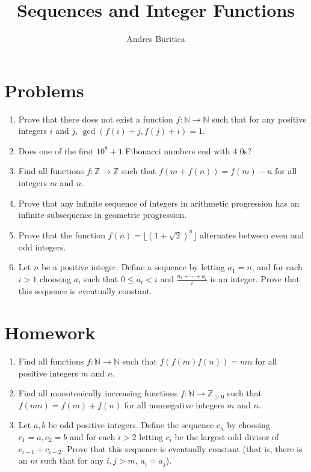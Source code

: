 \documentclass{article}
\title{Sequences and Integer Functions}
\author{Andres Buritica}
\date{}
\newcommand\Nn{\mathbb{N}}
\newcommand\Zz{\mathbb{Z}}
\begin{document}
\maketitle
\section{Problems}
\begin{enumerate}
  \item Prove that there does not exist a function $f:\Nn\to\Nn$
    such that for any positive integers $i$ and $j$,
    $\gcd(f(i)+j,f(j)+i)=1$.
  \item Does one of the first $10^8+1$ Fibonacci numbers end with 4 0s?
  \item Find all functions $f:\Zz\to\Zz$ such that $f(m+f(n))=f(m)-n$ for all
    integers $m$ and $n$.
  \item Prove that any infinite sequence of integers in arithmetic progression has an
    infinite subsequence in geometric progression.
  \item Prove that the function $f(n)=\lfloor(1+\sqrt 2)^n\rfloor$ alternates
    between even and odd integers.
  \item Let $n$ be a positive integer. Define a sequence by letting $a_1=n$, and
    for each $i>1$ choosing $a_i$ such that $0\le a_i<i$ and
    $\frac{a_1+\cdots+a_i}i$ is an integer. Prove that this sequence is
    eventually constant.
\end{enumerate}
\newpage
\section{Homework}
\begin{enumerate}
  \item Find all functions $f:\Nn\to\Nn$ such that $f(f(m)f(n))=mn$ for all
    positive integers $m$ and $n$.
  \item Find all monotonically increasing functions $f:\Nn\to\Zz_{\ge 0}$ such that $f(mn)=f(m)+f(n)$ for
    all nonnegative integers $m$ and $n$.
  \item Let $a,b$ be odd positive integers. Define the sequence $c_n$ by
    choosing $c_1=a,c_2=b$ and for each $i>2$ letting $c_i$ be the largest odd
    divisor of $c_{i-1}+c_{i-2}$. Prove that this sequence is eventually
    constant
    (that is, there is an $m$ such that for any $i,j>m$, $a_i=a_j$).
\end{enumerate}
\end{document}
